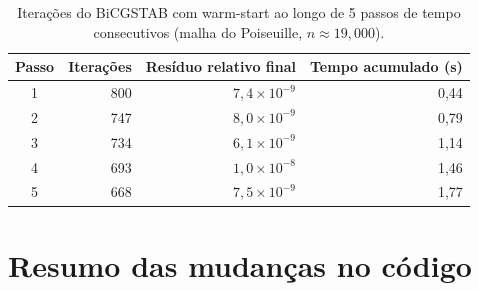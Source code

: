\documentclass[11pt,a4paper]{article}
\begin{document}
\begin{table}[h]
\centering
\caption{Iterações do BiCGSTAB com warm-start ao longo de 5 passos de
tempo consecutivos (malha do Poiseuille, $n\approx 19{,}000$).}
\label{tab:warmstart}
\begin{tabular}{@{}crrr@{}}
\toprule
Passo & Iterações & Resíduo relativo final & Tempo acumulado (s) \\
\midrule
1 & 800 & $7{,}4\times10^{-9}$ & 0,44 \\
2 & 747 & $8{,}0\times10^{-9}$ & 0,79 \\
3 & 734 & $6{,}1\times10^{-9}$ & 1,14 \\
4 & 693 & $1{,}0\times10^{-8}$ & 1,46 \\
5 & 668 & $7{,}5\times10^{-9}$ & 1,77 \\
\bottomrule
\end{tabular}
\end{table}

\section{Resumo das mudanças no código}
\end{document}
